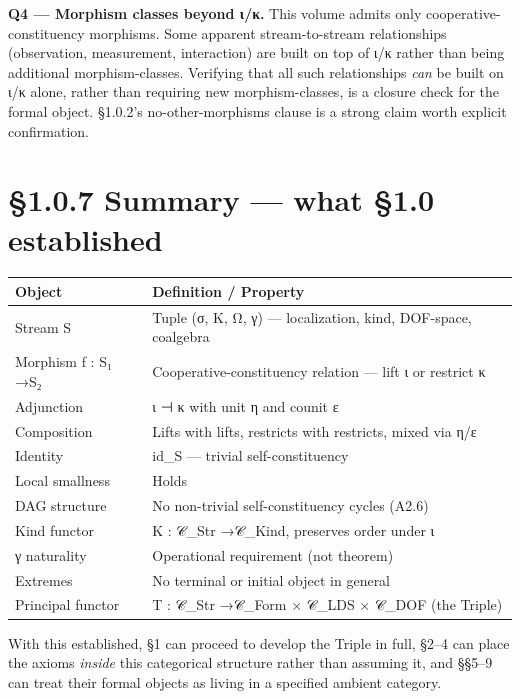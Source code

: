 \documentclass[11pt, openany]{book}
\newcommand{\sectionbreak}{\clearpage}
\begin{document}
\textbf{Q4 --- Morphism classes beyond ι/κ.} This volume admits only cooperative-constituency morphisms. Some apparent stream-to-stream relationships (observation, measurement, interaction) are built on top of ι/κ rather than being additional morphism-classes. Verifying that all such relationships \textit{can} be built on ι/κ alone, rather than requiring new morphism-classes, is a closure check for the formal object. §1.0.2's no-other-morphisms clause is a strong claim worth explicit confirmation.

\sectionbreak

\section{§1.0.7 Summary --- what §1.0 established}

\begingroup\setlength{\tabcolsep}{3pt}\renewcommand{\arraystretch}{1.15}\footnotesize
\begin{longtable}{p{1.08in} p{3.30in}}
\toprule
Object & Definition / Property \\
\midrule
\endhead
\bottomrule
\endfoot
Stream S & Tuple (σ, K, Ω, γ) --- localization, kind, DOF-space, coalgebra \\
\midrule
Morphism f : S₁ →\allowbreak  S₂ & Cooperative-constituency relation --- lift ι or restrict κ \\
\midrule
Adjunction & ι ⊣ κ with unit η and counit ε \\
\midrule
Composition & Lifts with lifts, restricts with restricts, mixed via η/\allowbreak ε \\
\midrule
Identity & id\_\allowbreak{}S --- trivial self-constituency \\
\midrule
Local smallness & Holds \\
\midrule
DAG structure & No non-trivial self-constituency cycles (A2.6) \\
\midrule
Kind functor & K : 𝒞\_\allowbreak{}Str →\allowbreak  𝒞\_\allowbreak{}Kind, preserves order under ι \\
\midrule
γ naturality & Operational requirement (not theorem) \\
\midrule
Extremes & No terminal or initial object in general \\
\midrule
Principal functor & T : 𝒞\_\allowbreak{}Str →\allowbreak  𝒞\_\allowbreak{}Form × 𝒞\_\allowbreak{}LDS × 𝒞\_\allowbreak{}DOF (the Triple) \\
\bottomrule
\end{longtable}
\endgroup
With this established, §1 can proceed to develop the Triple in full, §2–4 can place the axioms \textit{inside} this categorical structure rather than assuming it, and §§5–9 can treat their formal objects as living in a specified ambient category.
\end{document}
